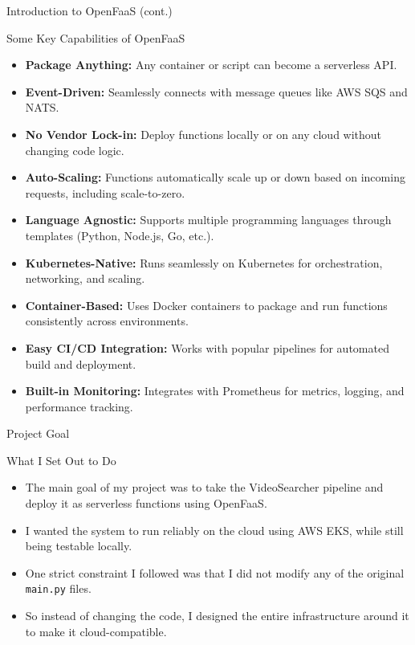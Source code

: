 \documentclass[aspectratio=169,10pt]{beamer}
\begin{document}
\begin{frame}{Introduction to OpenFaaS (cont.)}
        \begin{block}{Some Key Capabilities of OpenFaaS}
                \begin{itemize}[<+->]
                    \item \textbf{Package Anything:} Any container or script can become a serverless API.
                    \item \textbf{Event-Driven:} Seamlessly connects with message queues like AWS SQS and NATS.
                    \item \textbf{No Vendor Lock-in:} Deploy functions locally or on any cloud without changing code logic.
                    \item \textbf{Auto-Scaling:} Functions automatically scale up or down based on incoming requests, including scale-to-zero.
                    \item \textbf{Language Agnostic:} Supports multiple programming languages through templates (Python, Node.js, Go, etc.).
                    \item \textbf{Kubernetes-Native:} Runs seamlessly on Kubernetes for orchestration, networking, and scaling.
                    \item \textbf{Container-Based:} Uses Docker containers to package and run functions consistently across environments.
                    \item \textbf{Easy CI/CD Integration:} Works with popular pipelines for automated build and deployment.
                    \item \textbf{Built-in Monitoring:} Integrates with Prometheus for metrics, logging, and performance tracking.
                \end{itemize}
            \end{block}
\end{frame}
\begin{frame}{Project Goal}
    \begin{block}{What I Set Out to Do}
        \begin{itemize}[<+->]
            \item The main goal of my project was to take the VideoSearcher pipeline and deploy it as serverless functions using OpenFaaS.
            \item I wanted the system to run reliably on the cloud using AWS EKS, while still being testable locally.
            \item One strict constraint I followed was that I did not modify any of the original \texttt{main.py} files.
            \item So instead of changing the code, I designed the entire infrastructure around it to make it cloud-compatible.
        \end{itemize}
    \end{block}
\end{frame}
\end{document}
